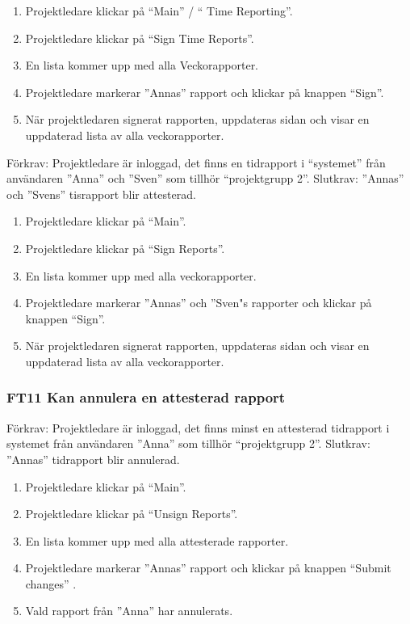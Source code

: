 \documentclass[paper=a4, fontsize=11pt,twoside]{article}
\begin{document}
		\begin{enumerate}
		  \item Projektledare klickar på “Main” / “ Time Reporting”.
		  \item Projektledare klickar på “Sign Time Reports”.
		  \item En lista kommer upp med alla Veckorapporter.
		  \item Projektledare  markerar ”Annas” rapport och klickar på knappen “Sign”.
		  \item När projektledaren signerat rapporten, uppdateras sidan och visar en
	uppdaterad lista av alla veckorapporter.
		  
		\end{enumerate}
		
		Förkrav: Projektledare är inloggad, det finns en tidrapport i “systemet” från
		användaren  ”Anna” och ”Sven” som tillhör “projektgrupp 2”.
		\newline
		Slutkrav: ”Annas” och ”Svens” tisrapport blir attesterad.
		
		\begin{enumerate}
    		\item Projektledare klickar på “Main”.
			\item Projektledare klickar på “Sign Reports”.
			\item En lista kommer upp med alla veckorapporter.
			\item Projektledare  markerar ”Annas” och ”Sven"s rapporter och klickar på
			knappen “Sign”.
			\item När projektledaren signerat rapporten, uppdateras sidan och visar en
			uppdaterad lista av alla veckorapporter.

				  

		\end{enumerate}
		
		\subsubsection*{FT11 Kan annulera en attesterad rapport}
		
		Förkrav: Projektledare är inloggad, det finns minst en attesterad tidrapport i
		systemet från användaren  ”Anna” som tillhör “projektgrupp 2”.
		\newline
		Slutkrav: ”Annas” tidrapport blir annulerad.
		
		\begin{enumerate}
		  \item Projektledare klickar på “Main”.
		  \item Projektledare klickar på “Unsign Reports”.
		  \item En lista kommer upp med alla attesterade rapporter.
		  \item Projektledare markerar ”Annas” rapport och klickar på knappen “Submit
		  changes” .
		  \item Vald rapport från ”Anna” har annulerats.
		  
		\end{enumerate}
		
\end{document}
